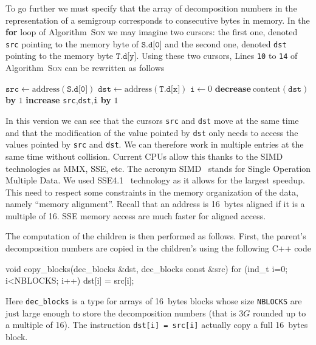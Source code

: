 \documentclass[reqno,11pt]{amsart}
\theoremstyle{plain}
\theoremstyle{definition}
\renewcommand{\leq}{\leqslant}
\renewcommand{\tt}[1]{\texttt{#1}}
\begin{document}
To go further we must specify that the array of decomposition numbers in the
representation of a semigroup corresponds to consecutive bytes in memory. In
the \textbf{for} loop of Algorithm~\textsc{Son} we may imagine two cursors:
the first one, denoted \texttt{src} pointing to the memory byte of
$\texttt{S.d[0]}$ and the second one, denoted \texttt{dst} pointing to the
memory byte $\texttt{T.d[y]}$.  Using these two cursors, Lines \tt{10} to
\tt{14} of Algorithm~\textsc{Son} can be rewritten as follows

\begin{algorithmic}
\State $\tt{src}\gets \text{address}(\tt{S.d[0]})$
\State $\tt{dst}\gets \text{address}(\tt{T.d[x]})$
\State $\tt{i}\gets 0$
\While{$\tt{i}\leq \tt{3G}-\tt{x}$}
\If{$\text{content}(\tt{src})>0$}
\State $\textbf{decrease}\ \text{content}(\tt{dst})$ \textbf{by} $1$\EndIf
\State \textbf{increase} \tt{src},\tt{dst},\tt{i} \textbf{by} $1$

\EndWhile
\end{algorithmic}

\noindent In this version we can see that the cursors \texttt{src} and
\texttt{dst} move at the same time and that the modification of the value
pointed by \texttt{dst} only needs to access the values pointed by \tt{src}
and \tt{dst}.  We can therefore work in multiple entries at the same time
without collision.  Current CPUs allow this thanks to the SIMD technologies as
MMX, SSE, etc.  The acronym SIMD~\cite{SIMD} stands for Single Operation
Multiple Data.  We used SSE4.1~\cite{SSE, IntelSSE} technology as it allows
for the largest speedup. This need to respect some constraints in the memory
organization of the data, namely ``memory alignment''. Recall that an address
is 16~bytes aligned if it is a multiple of 16. SSE memory access are much
faster for aligned access.

The computation of the children is then performed as follows. First, the
parent's decomposition numbers are copied in the children's using the
following C++ code
\begin{listing}{1}
void copy_blocks(dec_blocks &dst, dec_blocks const &src) {
  for (ind_t i=0; i<NBLOCKS; i++) dst[i] = src[i];
}
\end{listing}
Here \tt{dec\_blocks} is a type for arrays of 16~bytes blocks whose size
\tt{NBLOCKS} are just large enough to store the decomposition numbers (that is
$3G$ rounded up to a multiple of 16). The instruction \tt{dst[i] = src[i]}
actually copy a full 16~bytes block.
\end{document}

